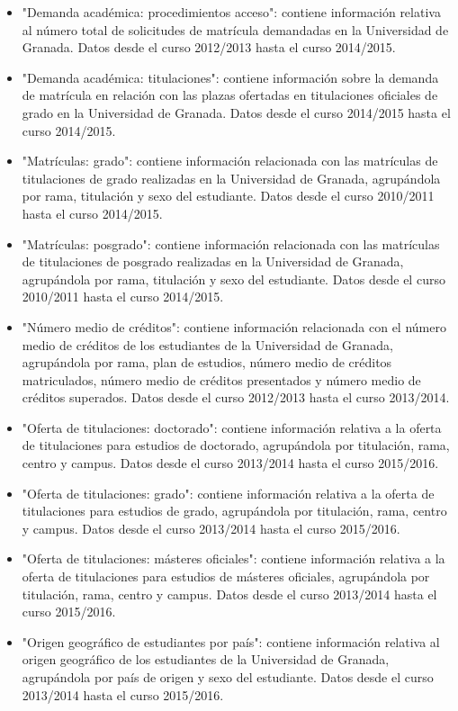 \begin{itemize}
	\item "Demanda académica: procedimientos acceso": contiene información relativa al número total de solicitudes de matrícula demandadas en la Universidad de Granada. Datos desde el curso 2012/2013 hasta el curso 2014/2015.
	\item "Demanda académica: titulaciones": contiene información sobre la demanda de matrícula en relación con las plazas ofertadas en titulaciones oficiales de grado en la Universidad de Granada. Datos desde el curso 2014/2015 hasta el curso 2014/2015.
	\item "Matrículas: grado": contiene información relacionada con las matrículas de titulaciones de grado realizadas en la Universidad de Granada, agrupándola por rama, titulación y sexo del estudiante. Datos desde el curso 2010/2011 hasta el curso 2014/2015.
	\item "Matrículas: posgrado": contiene información relacionada con las matrículas de titulaciones de posgrado realizadas en la Universidad de Granada, agrupándola por rama, titulación y sexo del estudiante. Datos desde el curso 2010/2011 hasta el curso 2014/2015.
	\item "Número medio de créditos": contiene información relacionada con el número medio de créditos de los estudiantes de la Universidad de Granada, agrupándola por rama, plan de estudios, número medio de créditos matriculados, número medio de créditos presentados y número medio de créditos superados. Datos desde el curso 2012/2013 hasta el curso 2013/2014.
	\item "Oferta de titulaciones: doctorado": contiene información relativa a la oferta de titulaciones para estudios de doctorado, agrupándola por titulación, rama, centro y campus. Datos desde el curso 2013/2014 hasta el curso 2015/2016.
	\item "Oferta de titulaciones: grado": contiene información relativa a la oferta de titulaciones para estudios de grado, agrupándola por titulación, rama, centro y campus. Datos desde el curso 2013/2014 hasta el curso 2015/2016.
	\item "Oferta de titulaciones: másteres oficiales":  contiene información relativa a la oferta de titulaciones para estudios de másteres oficiales, agrupándola por titulación, rama, centro y campus. Datos desde el curso 2013/2014 hasta el curso 2015/2016.
	\item "Origen geográfico de estudiantes por país": contiene información relativa al origen geográfico de los estudiantes de la Universidad de Granada, agrupándola por país de origen y sexo del estudiante. Datos desde el curso 2013/2014 hasta el curso 2015/2016.

\end{itemize}

